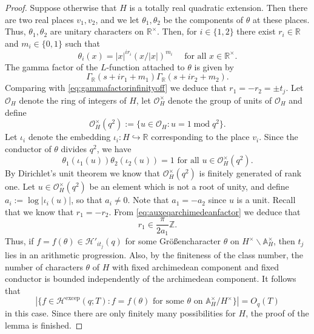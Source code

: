 \documentclass{article}
\theoremstyle{named}
\newcommand{\HH}{\mathcal{H}}
\newcommand{\Z}{\mathbb{Z}}
\newcommand{\A}{\mathbb{A}}
\newcommand{\R}{\mathbb{R}}
\renewcommand{\O}{\mathcal{O}}
\DeclareMathOperator{\modulo}{mod}
\begin{document}
\begin{proof}
Suppose otherwise that $H$ is a totally real quadratic extension. Then there are two real places $v_1, v_2$, and we let $\theta_1, \theta_2$ be the components of $\theta$ at these places. Thus, $\theta_1, \theta_2$ are unitary characters on $\R^\times$. Then, for $i \in \{1, 2\}$ there exist $r_i \in \R$ and $m_i \in \{0, 1\}$ such that 
    \begin{equation*}
        \theta_i(x) = |x|^{ir_i} (x/|x|)^{m_i} \quad \text{ for all }x \in \R^\times. 
    \end{equation*}
    The gamma factor of the $L$-function attached to $\theta$ is given by 
    \begin{equation*}
        \Gamma_\R(s + ir_1 + m_1)\Gamma_\R(s + ir_2 + m_2). 
    \end{equation*}
Comparing with \eqref{eq:gammafactorinfinityoff} we deduce that $r_1 = -r_2 = \pm t_j$. Let $\O_H$ denote the ring of integers of $H$, let $\O^\times_{H}$ denote the group of units of $\O_H$ and define 
    \begin{equation*}
        \O_H^\times(q^2) := \{u \in \O_H: u = 1 \modulo q^2\}.
    \end{equation*}
    Let $\iota_i$ denote the embedding $\iota_i : H \hookrightarrow \R$ corresponding to the place $v_i$.  
    Since the conductor of $\theta$ divides $q^2$, we have 
    \begin{equation}\label{eq:auxeqarchimedeanfactor}
        \theta_1(\iota_1(u))\theta_2(\iota_2(u)) = 1 \text{ for all }u \in \O_H^\times(q^2). 
    \end{equation}
    By Dirichlet's unit theorem we know that $\O_H^\times(q^2)$ is finitely generated of rank one. Let $u \in \O_H^\times(q^2)$ be an element which is not a root of unity, and define $a_i := \log |\iota_i(u)|$, so that $a_i \neq 0$. Note that $a_1 = -a_2$ since $u$ is a unit. Recall that we know that $r_1 = -r_2$. From \eqref{eq:auxeqarchimedeanfactor} we deduce that 
    \begin{equation*}
        r_1 \in \frac{\pi}{2a_1}\Z.
    \end{equation*}  
Thus, if $f = f(\theta) \in \HH'_{it_j}(q)$ for some Größencharacter $\theta$ on $H^\times \backslash \A^\times_H$, then $t_j$ lies in an arithmetic progression. Also, by the finiteness of the class number, the number of characters $\theta$ of $H$ with fixed archimedean component and fixed conductor is bounded independently of the archimedean component. It follows that  
    \begin{equation*}
        |\{f \in \HH^{\text{excep}}(q; T): f = f(\theta) \text{ for some }\theta \text{ on } \A_{H}^\times/H^\times\}| = O_q(T)
    \end{equation*} 
in this case. Since there are only finitely many possibilities for $H$, the proof of the lemma is finished. 
\end{proof}
\end{document}
